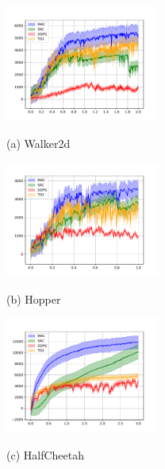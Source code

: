 \begin{figure}[t]
\begin{minipage}{0.33\linewidth}
\centering
\includegraphics[width=2in]{./mujoco-results/Walker2d-v2-AVE.pdf}
\centerline{(a) Walker2d}
\end{minipage}%
\begin{minipage}{0.33\linewidth}
\centering
\includegraphics[width=2in]{./mujoco-results/Hopper-v2-AVE.pdf}
\centerline{(b) Hopper}
\end{minipage}%
\begin{minipage}{0.33\linewidth}
\centering
\includegraphics[width=2in]{./mujoco-results/HalfCheetah-v2-AVE.pdf}
\centerline{(c) HalfCheetah}
\end{minipage}%


\end{figure}
